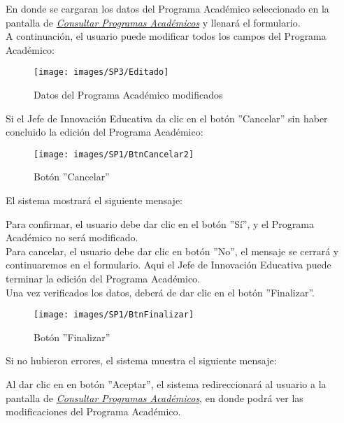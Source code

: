         En donde se cargaran los datos del Programa Académico seleccionado en la pantalla de \hyperlink{consultarpa}{\textit{Consultar Programas Académicos}} y llenará el formulario.\\

        A continuación, el usuario puede modificar todos los campos del Programa Académico:
        \begin{figure}[!hbtp]
        	\centering
        	\hypertarget{modif}{\texttt{[image: images/SP3/Editado]}}
        	\caption{Datos del Programa Académico modificados}
        	\label{modif}
        \end{figure}

        Si el Jefe de Innovación Educativa da clic en el botón ''Cancelar'' sin haber concluido la edición del Programa Académico:

        \begin{figure}[!hbtp]
        	\centering
        	\hypertarget{cancel2}{\texttt{[image: images/SP1/BtnCancelar2]}}
        	\caption{Botón ''Cancelar''}
        	\label{cancel2}
        \end{figure}

        El sistema mostrará el siguiente mensaje:

        Para confirmar, el usuario debe dar clic en el botón ''Sí'', y el Programa Académico no será modificado.\\

        Para cancelar, el usuario debe dar clic en botón ''No'', el mensaje se cerrará y continuaremos en el formulario. Aqui el Jefe de Innovación Educativa puede terminar la edición del Programa Académico.\\

        Una vez verificados los datos, deberá de dar clic en el botón ''Finalizar''.
        \begin{figure}[!hbtp]
        	\centering
        	\hypertarget{btnfin}{\texttt{[image: images/SP1/BtnFinalizar]}}
        	\caption{Botón ''Finalizar''}
        	\label{btnfin}
        \end{figure}

        Si no hubieron errores, el sistema muestra el siguiente mensaje:

        Al dar clic en en botón ''Aceptar'', el sistema redireccionará al usuario a la pantalla de \hyperlink{consultarpa}{\textit{Consultar Programas Académicos}}, en donde podrá ver las modificaciones del Programa Académico.\\

